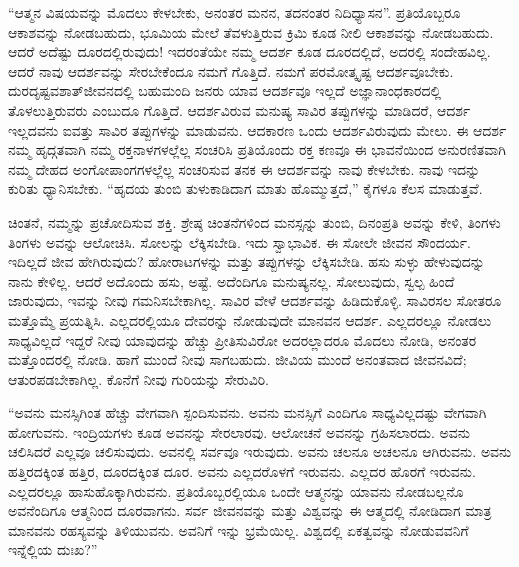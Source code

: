 “ಆತ್ಮನ ವಿಷಯವನ್ನು ಮೊದಲು ಕೇಳಬೇಕು, ಅನಂತರ ಮನನ, ತದನಂತರ ನಿದಿಧ್ಯಾಸನ”. ಪ್ರತಿಯೊಬ್ಬರೂ ಆಕಾಶವನ್ನು ನೋಡಬಹುದು, ಭೂಮಿಯ ಮೇಲೆ ತೆವಳುತ್ತಿರುವ ಕ್ರಿಮಿ ಕೂಡ ನೀಲಿ ಆಕಾಶವನ್ನು ನೋಡಬಹುದು. ಆದರೆ ಅದೆಷ್ಟು ದೂರದಲ್ಲಿರುವುದು! ಇದರಂತೆಯೇ ನಮ್ಮ ಆದರ್ಶ ಕೂಡ ದೂರದಲ್ಲಿದೆ, ಅದರಲ್ಲಿ ಸಂದೇಹವಿಲ್ಲ. ಆದರೆ ನಾವು ಆದರ್ಶವನ್ನು ಸೇರಬೇಕೆಂದೂ ನಮಗೆ ಗೊತ್ತಿದೆ. ನಮಗೆ ಪರಮೋತ್ಕೃಷ್ಟ ಆದರ್ಶವೂಬೇಕು. ದುರದೃಷ್ಟವಶಾತ್​ ಜೀವನದಲ್ಲಿ ಬಹುಮಂದಿ ಜನರು ಯಾವ ಆದರ್ಶವೂ ಇಲ್ಲದೆ ಅಜ್ಞಾನಾಂಧಕಾರದಲ್ಲಿ ತೊಳಲುತ್ತಿರುವರು ಎಂಬುದೂ ಗೊತ್ತಿದೆ. ಆದರ್ಶವಿರುವ ಮನುಷ್ಯ ಸಾವಿರ ತಪ್ಪುಗಳನ್ನು ಮಾಡಿದರೆ, ಆದರ್ಶ ಇಲ್ಲದವನು ಐವತ್ತು ಸಾವಿರ ತಪ್ಪುಗಳನ್ನು ಮಾಡುವನು. ಆದಕಾರಣ ಒಂದು ಆದರ್ಶವಿರುವುದು ಮೇಲು. ಈ ಆದರ್ಶ ನಮ್ಮ ಹೃದ್ಗತವಾಗಿ ನಮ್ಮ ರಕ್ತನಾಳಗಳಲ್ಲೆಲ್ಲ ಸಂಚರಿಸಿ ಪ್ರತಿಯೊಂದು ರಕ್ತ ಕಣವೂ ಈ ಭಾವನೆಯಿಂದ ಅನುರಣಿತವಾಗಿ ನಮ್ಮ ದೇಹದ ಅಂಗೋಪಾಂಗಗಳಲ್ಲೆಲ್ಲ ಸಂಚರಿಸುವ ತನಕ ಈ ಆದರ್ಶವನ್ನು ನಾವು ಕೇಳಬೇಕು. ನಾವು ಇದನ್ನು ಕುರಿತು ಧ್ಯಾನಿಸಬೇಕು. “ಹೃದಯ ತುಂಬಿ ತುಳುಕಾಡಿದಾಗ ಮಾತು ಹೊಮ್ಮುತ್ತದೆ,” ಕೈಗಳೂ ಕೆಲಸ ಮಾಡುತ್ತವೆ.

ಚಿಂತನೆ, ನಮ್ಮನ್ನು ಪ್ರಚೋದಿಸುವ ಶಕ್ತಿ. ಶ್ರೇಷ್ಠ ಚಿಂತನೆಗಳಿಂದ ಮನಸ್ಸನ್ನು ತುಂಬಿ, ದಿನಂಪ್ರತಿ ಅವನ್ನು ಕೇಳಿ, ತಿಂಗಳು ತಿಂಗಳು ಅವನ್ನು ಆಲೋಚಿಸಿ. ಸೋಲನ್ನು ಲೆಕ್ಕಿಸಬೇಡಿ. ಇದು ಸ್ವಾಭಾವಿಕ. ಈ ಸೋಲೇ ಜೀವನ ಸೌಂದರ್ಯ. ಇದಿಲ್ಲದೆ ಜೀವ ಹೇಗಿರುವುದು? ಹೋರಾಟಗಳನ್ನು ಮತ್ತು ತಪ್ಪುಗಳನ್ನು ಲೆಕ್ಕಿಸಬೇಡಿ. ಹಸು ಸುಳ್ಳು ಹೇಳುವುದನ್ನು ನಾನು ಕೇಳಿಲ್ಲ. ಆದರೆ ಅದೊಂದು ಹಸು, ಅಷ್ಟೆ. ಅದೆಂದಿಗೂ ಮನುಷ್ಯನಲ್ಲ. ಸೋಲುವುದು, ಸ್ವಲ್ಪ ಹಿಂದೆ ಜಾರುವುದು, ಇವನ್ನು ನೀವು ಗಮನಿಸಬೇಕಾಗಿಲ್ಲ. ಸಾವಿರ ವೇಳೆ ಆದರ್ಶವನ್ನು ಹಿಡಿದುಕೊಳ್ಳಿ. ಸಾವಿರಸಲ ಸೋತರೂ ಮತ್ತೊಮ್ಮೆ ಪ್ರಯತ್ನಿಸಿ. ಎಲ್ಲದರಲ್ಲಿಯೂ ದೇವರನ್ನು ನೋಡುವುದೇ ಮಾನವನ ಆದರ್ಶ. ಎಲ್ಲದರಲ್ಲೂ ನೋಡಲು ಸಾಧ್ಯವಿಲ್ಲದೆ ಇದ್ದರೆ ನೀವು ಯಾವುದನ್ನು ಹೆಚ್ಚು ಪ್ರೀತಿಸುವಿರೋ ಅದರಲ್ಲಾದರೂ ಮೊದಲು ನೋಡಿ, ಅನಂತರ ಮತ್ತೊಂದರಲ್ಲಿ ನೋಡಿ. ಹಾಗೆ ಮುಂದೆ ನೀವು ಸಾಗಬಹುದು. ಜೀವಿಯ ಮುಂದೆ ಅನಂತವಾದ ಜೀವನವಿದೆ; ಆತುರಪಡಬೇಕಾಗಿಲ್ಲ. ಕೊನೆಗೆ ನೀವು ಗುರಿಯನ್ನು ಸೇರುವಿರಿ.

“ಅವನು ಮನಸ್ಸಿಗಿಂತ ಹೆಚ್ಚು ವೇಗವಾಗಿ ಸ್ಪಂದಿಸುವನು. ಅವನು ಮನಸ್ಸಿಗೆ ಎಂದಿಗೂ ಸಾಧ್ಯವಿಲ್ಲದಷ್ಟು ವೇಗವಾಗಿ ಹೋಗುವನು. ಇಂದ್ರಿಯಗಳು ಕೂಡ ಅವನನ್ನು ಸೇರಲಾರವು. ಆಲೋಚನೆ ಅವನನ್ನು ಗ್ರಹಿಸಲಾರದು. ಅವನು ಚಲಿಸಿದರೆ ಎಲ್ಲವೂ ಚಲಿಸುವುದು. ಅವನಲ್ಲಿ ಸರ್ವವೂ ಇರುವುದು. ಅವನು ಚಲನೂ ಅಚಲನೂ ಆಗಿರುವನು. ಅವನು ಹತ್ತಿರದಕ್ಕಿಂತ ಹತ್ತಿರ, ದೂರದಕ್ಕಿಂತ ದೂರ. ಅವನು ಎಲ್ಲದರೊಳಗೆ ಇರುವನು. ಎಲ್ಲದರ ಹೊರಗೆ ಇರುವನು. ಎಲ್ಲದರಲ್ಲೂ ಹಾಸುಹೊಕ್ಕಾಗಿರುವನು. ಪ್ರತಿಯೊಬ್ಬರಲ್ಲಿಯೂ ಒಂದೇ ಆತ್ಮನನ್ನು ಯಾವನು ನೋಡಬಲ್ಲನೊ ಅವನೆಂದಿಗೂ ಆತ್ಮನಿಂದ ದೂರವಾಗನು. ಸರ್ವ ಜೀವನವನ್ನು ಮತ್ತು ವಿಶ್ವವನ್ನು ಈ ಆತ್ಮದಲ್ಲಿ ನೋಡಿದಾಗ ಮಾತ್ರ ಮಾನವನು ರಹಸ್ಯವನ್ನು ತಿಳಿಯುವನು. ಅವನಿಗೆ ಇನ್ನು ಭ್ರಮೆಯಿಲ್ಲ. ವಿಶ್ವದಲ್ಲಿ ಏಕತ್ವವನ್ನು ನೋಡುವವನಿಗೆ ಇನ್ನೆಲ್ಲಿಯ ದುಃಖ?”

